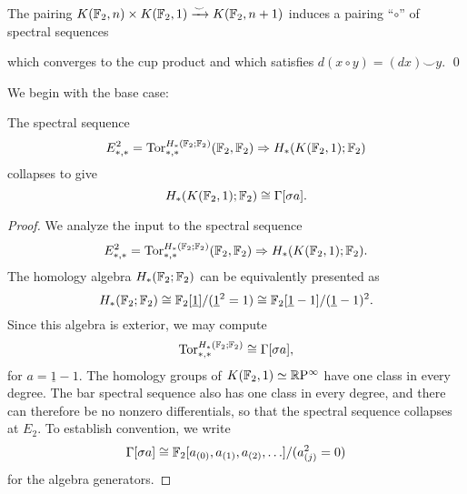 \begin{lemma}
The pairing $K(\mathbb F_2, n) \times K(\mathbb F_2, 1) \xrightarrow\smile K(\mathbb F_2, n+1)$ induces a pairing ``$\circ$'' of spectral sequences
\begin{center}
\end{center}
which converges to the cup product and which satisfies $d(x \circ y) = (dx) \smile y$.
\qed
\end{lemma}

We begin with the base case:
\begin{lemma}\label{UnstableSAlgBase}
The spectral sequence \[E_{*, *}^2 = \operatorname{Tor}^{H_*(\mathbb F_2; \mathbb F_2)}_{*, *}(\mathbb F_2, \mathbb F_2) \Rightarrow H_*(K(\mathbb F_2, 1); \mathbb F_2)\] collapses to give \[H_*(K(\mathbb F_2, 1); \mathbb F_2) \cong \Gamma[\sigma a].\]
\end{lemma}
\begin{proof}
We analyze the input to the spectral sequence \[E_{*, *}^2 = \operatorname{Tor}^{H_*(\mathbb F_2; \mathbb F_2)}_{*, *}(\mathbb F_2, \mathbb F_2) \Rightarrow H_*(K(\mathbb F_2, 1); \mathbb F_2).\]
The homology algebra $H_*(\mathbb F_2; \mathbb F_2)$ can be equivalently presented as \[H_*(\mathbb F_2; \mathbb F_2) \cong \mathbb F_2[\underline{1}] / (\underline 1^2 = 1) \cong \mathbb F_2[\underline 1 - 1] / (\underline 1 - 1)^2.\]
Since this algebra is exterior, we may compute \[\operatorname{Tor}^{H_*(\mathbb F_2; \mathbb F_2)}_{*, *} \cong \Gamma[\sigma a],\] for $a = \underline 1 - 1$.
The homology groups of $K(\mathbb F_2, 1) \simeq \mathbb R \mathrm{P}^\infty$ have one class in every degree.
The bar spectral sequence also has one class in every degree, and there can therefore be no nonzero differentials, so that the spectral sequence collapses at $E_2$.
To establish convention, we write \[\Gamma[\sigma a] \cong \mathbb F_2[a_{(0)}, a_{(1)}, a_{(2)}, \ldots] / (a_{(j)}^2 = 0)\] for the algebra generators.
\end{proof}

